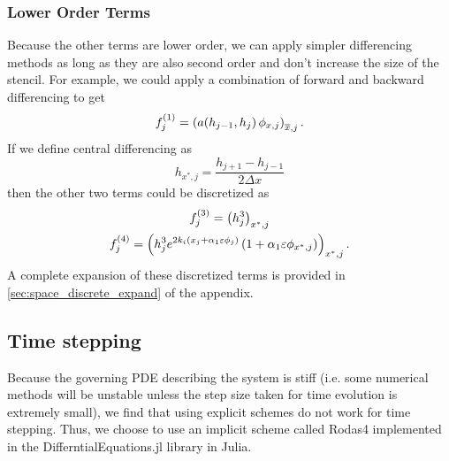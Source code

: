 \subsubsection{Lower Order Terms}
Because the other terms are lower order, we can apply simpler differencing methods as long as 
they are also second order and don't increase the size of the stencil. For example, we could apply 
a combination of forward and backward differencing to get 
\begin{align}
    f_j^{\left( 1 \right)} = \left( a\!\left( h_{j-1}, h_j \right)\phi_{x, j} \right)_{\overline{x}, j}. 
\end{align}
If we define central differencing as 
\begin{equation*}
    h_{x^*, j} = \frac{h_{j+1} - h_{j-1}}{2\Delta x}
\end{equation*}
then the other two terms could be discretized as 
\begin{gather}
    f_j^{\left( 3 \right)} = \left( h^3_j \right)_{x^*, j}\\
    f_j^{\left( 4 \right)} = \left( h^3_j e^{2k_i \left( x_j + \alpha_1 \varepsilon \phi_j \right)} \left( 1 + \alpha_1 \varepsilon \phi_{x^*, j} \right) \right)_{x^*, j}. 
\end{gather}
A complete expansion of these discretized terms is provided in \cref{sec:space_discrete_expand} of the appendix. 

\subsection{Time stepping}
Because the governing PDE describing the system is stiff (i.e. some numerical methods will be unstable unless the step size taken for time evolution is extremely small), 
we find that using explicit schemes do not work for time stepping. Thus, we choose to use an implicit scheme called Rodas4 implemented 
in the DifferntialEquations.jl library in Julia. 